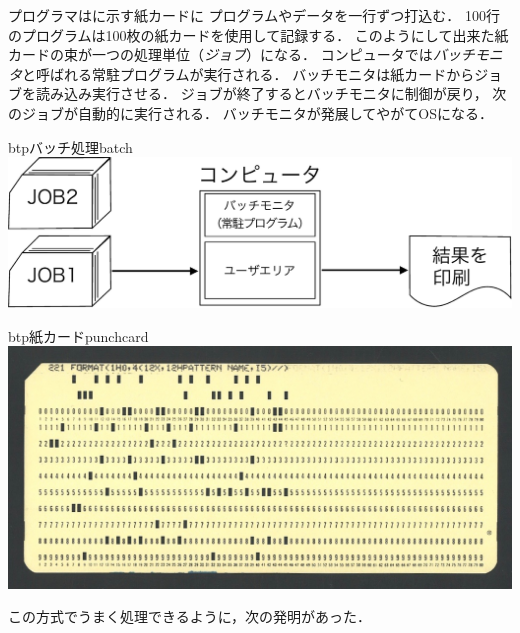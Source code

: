 プログラマはに示す紙カードに
プログラムやデータを一行ずつ打込む．
100行のプログラムは100枚の紙カードを使用して記録する．
このようにして出来た紙カードの束が一つの処理単位（\emph{ジョブ}）になる．
コンピュータでは\emph{バッチモニタ}と呼ばれる常駐プログラムが実行される．
バッチモニタは紙カードからジョブを読み込み実行させる．
ジョブが終了するとバッチモニタに制御が戻り，
次のジョブが自動的に実行される．
バッチモニタが発展してやがてOSになる．

\begin{myfig}{btp}{バッチ処理}{batch}
  \includegraphics[scale=0.60]{Fig/batch-crop.pdf}
\end{myfig}

\begin{myfig}{btp}{紙カード}{punchcard}
  \includegraphics[scale=0.3]{Photo/punchcard.jpg}
\end{myfig}

この方式でうまく処理できるように，次の発明があった．

